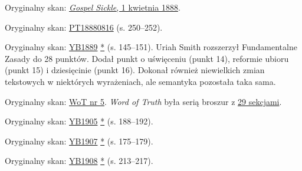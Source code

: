 
Oryginalny skan: \href{https://adventistdigitallibrary.org/adl-410336/gospel-sickle-april-1-1888?view_only=true&solr_nav%5Bid%5D=ff4d7f3f77b9bdf9e9ac&solr_nav%5Bpage%5D=0&solr_nav%5Boffset%5D=6}{\textit{Gospel Sickle}, 1 kwietnia 1888}.


Oryginalny skan: \href{https://adventistdigitallibrary.org/adl-402854/present-truth-august-16-1888?view_only=true&solr_nav%5Bid%5D=ff4d7f3f77b9bdf9e9ac&solr_nav%5Bpage%5D=0&solr_nav%5Boffset%5D=13}{PT18880816} (s. 250--252).


Oryginalny skan: \href{https://documents.adventistarchives.org/Yearbooks/YB1889.pdf#search=Yearbook%201889}{YB1889} \href{https://forgotten-pillar.s3.us-east-2.amazonaws.com/YB1889.pdf}{*} (s. 145--151). Uriah Smith rozszerzył Fundamentalne Zasady do 28 punktów. Dodał punkt o uświęceniu (punkt 14), reformie ubioru (punkt 15) i dziesięcinie (punkt 16). Dokonał również niewielkich zmian tekstowych w niektórych wyrażeniach, ale semantyka pozostała taka sama.


Oryginalny skan: \href{https://adl.b2.adventistdigitallibrary.org/concern/published_works/4ffda25e-a06b-48d4-8ace-67cdcd33726f}{WoT nr 5}.
\textit{Word of Truth} była serią broszur z \href{https://adl.b2.adventistdigitallibrary.org/concern/parent/22267078_fundamental_principles_of_seventh_day_adventists/published_works/94a22141-33e8-4b9a-b397-2fe48c17bec4}{29 sekcjami}.


Oryginalny skan: \href{https://documents.adventistarchives.org/Yearbooks/YB1905.pdf#search=Yearbook%201905}{YB1905} \href{https://forgotten-pillar.s3.us-east-2.amazonaws.com/YB1905.pdf}{*} (s. 188--192).


Oryginalny skan: \href{https://documents.adventistarchives.org/Yearbooks/YB1907.pdf#search=Yearbook%201906}{YB1907} \href{https://forgotten-pillar.s3.us-east-2.amazonaws.com/YB1907.pdf}{*} (s. 175--179).


Oryginalny skan: \href{https://documents.adventistarchives.org/Yearbooks/YB1908.pdf#search=Yearbook%201906}{YB1908} \href{https://forgotten-pillar.s3.us-east-2.amazonaws.com/YB1908.pdf}{*} (s. 213--217).

